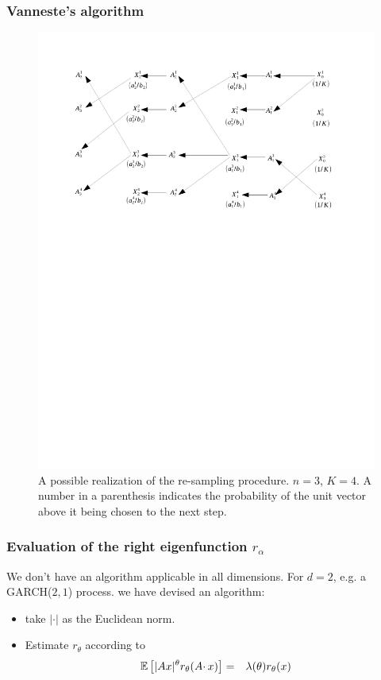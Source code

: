 \documentclass{beamer}
\begin{document}
\begin{frame}
  \frametitle{Vanneste's algorithm}
  \begin{figure}[htb!]
    \centering
    \includegraphics[width=0.8\linewidth, trim=2cm 16.5cm 2.5cm 2cm, clip]{AnandsEstimator.pdf}
    \caption{A possible realization of the re-sampling procedure. $n =
      3$, $K = 4$. A number in a parenthesis indicates the probability
      of the unit vector above it being chosen to the next step.}
    \label{fig:AnandsEstimator}
  \end{figure}
\end{frame}

\begin{frame}
  \frametitle{Evaluation of the right eigenfunction $r_\alpha$}
  We don't have an algorithm applicable in all dimensions. For $d = 2$,
  e.g. a GARCH($2, 1$) process. we have devised an algorithm:
  \begin{itemize}
  \item take $|\cdot|$ as the Euclidean norm.
  \item Estimate $r_\theta$ according to
    \begin{eqnarray}
      \label{eq:trhj}
      \mathbb{E} \left[
        |A x|^\theta r_\theta(A \cdotp x)
      \right]
      &=&
      \lambda(\theta) r_\theta(x)
    \end{eqnarray}
  \end{itemize}
\end{frame}
\end{document}
